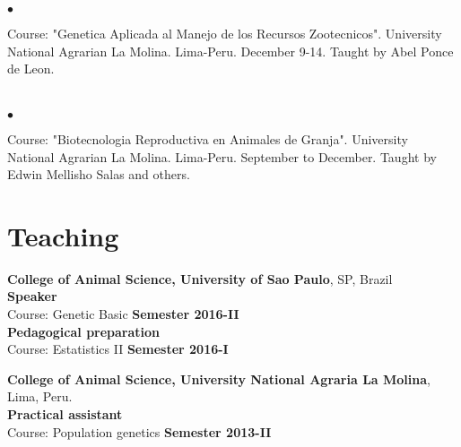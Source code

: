 \documentclass[margin,line,10pt]{res}
\newenvironment{list2}{
  \begin{list}{$\bullet$}{%
      \setlength{\itemsep}{0in}
      \setlength{\parsep}{0in} \setlength{\parskip}{0in}
      \setlength{\topsep}{0in} \setlength{\partopsep}{0in} 
      \setlength{\leftmargin}{0.2in}}}{\end{list}}
\begin{document}
\begin{resume}
\begin{list2}
\item Course: "Genetica Aplicada al Manejo de los Recursos Zootecnicos". University National Agrarian La Molina. Lima-Peru. December 9-14.
Taught by Abel Ponce de Leon.
\end{list2}  
\vspace{0.5cm}

\section{}

\begin{list2}
\item Course: "Biotecnologia Reproductiva en Animales de Granja". University National Agrarian La Molina. Lima-Peru. September to December.
Taught by Edwin Mellisho Salas and others.
\end{list2}  
\vspace{0.5cm}

\section{\sc Teaching}

{\bf College of Animal Science, University of Sao Paulo}, SP, Brazil\\
\textbf{Speaker}\\
Course: Genetic Basic     \hfill {\bf Semester 2016-II} \\
\textbf{Pedagogical preparation} \\
Course: Estatistics II     \hfill {\bf Semester 2016-I}\\
\vspace{0.5cm}

{\bf College of Animal Science, University National Agraria La Molina}, Lima, Peru.\\
\textbf{Practical assistant} \\
Course: Population genetics     \hfill {\bf Semester 2013-II} \\
\vspace{0.5cm}



\end{resume}
\end{document}
